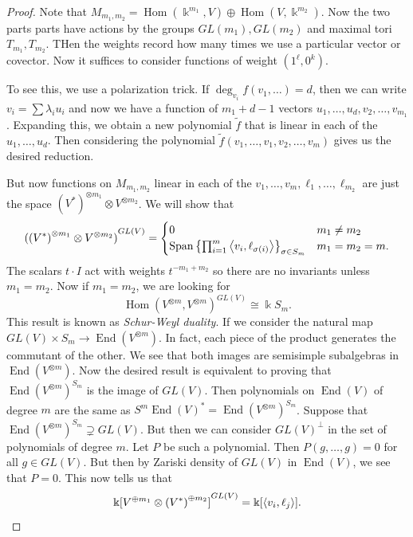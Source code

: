 \documentclass[leqno, openany]{memoir}
\theoremstyle{definition}
\theoremstyle{remark}
\theoremstyle{plain}
\theoremstyle{definition}
\theoremstyle{remark}
\renewcommand{\k}{\Bbbk}
\newcommand{\wtl}[1]{\widetilde{#1}}
\DeclareMathOperator{\Hom}{Hom}
\DeclareMathOperator{\End}{End}
\begin{document}
\begin{proof} Note that $M_{m_1, m_2} = \Hom(\k^{m_1}, V) \oplus \Hom(V,
    \k^{m_2})$. Now the two parts parts have actions by the groups $GL(m_1),
    GL(m_2)$ and maximal tori $T_{m_1}, T_{m_2}$. THen the weights record how
    many times we use a particular vector or covector. Now it suffices to
    consider functions of weight $(1^{\ell}, 0^k)$.

    To see this, we use a polarization trick. If $\deg_{v_i} f(v_1, \ldots) =
    d$, then we can write $v_i = \sum \lambda_i u_i$ and now we have a function
    of $m_1 + d-1$ vectors $u_1, \ldots, u_d, v_2, \ldots, v_{m_1}$. Expanding
    this, we obtain a new polynomial $\wtl{f}$ that is linear in each of the
    $u_1, \ldots, u_d$. Then considering the polynomial $\wtl{f}(v_1, \ldots,
    v_1, v_2, \ldots, v_m)$ gives us the desired reduction.

    But now functions on $M_{m_1, m_2}$ linear in each of the $v_1, \ldots,
    v_m, \ell_1, \ldots, \ell_{m_2}$ are just the space ${(V^*)}^{\otimes m_1}
    \otimes V^{\otimes m_2}$. We will show that \[ {({(V^*)}^{\otimes m_1}
        \otimes V^{\otimes m_2})}^{GL(V)} = \begin{cases} 0 & m_1 \neq m_2 \\
        \operatorname{Span} \qty{\prod_{i=1}^m \ev{v_i,
    \ell_{\sigma(i)}}}_{\sigma \in S_m} & m_1 = m_2 = m.  \end{cases} \] The
    scalars $t\cdot I$ act with weights $t^{-m_1 + m_2}$ so there are no
    invariants unless $m_1 = m_2$. Now if $m_1 = m_2$, we are looking for \[
    {\Hom(V^{\otimes m}, V^{\otimes m})}^{GL(V)} \cong \k S_m. \] This result
    is known as \textit{Schur-Weyl duality}. If we consider the natural map
    $GL(V) \times S_m \to \End(V^{\otimes m})$. In fact, each piece of the
    product generates the commutant of the other. We see that both images are
    semisimple subalgebras in $\End(V^{\otimes m})$. Now the desired result is
    equivalent to proving that ${\End(V^{\otimes m})}^{S_m}$ is the image of
    $GL(V)$. Then polynomials on $\End(V)$ of degree $m$ are the same as $S^m
    {\End(V)}^* = {\End(V^{\otimes m})}^{S_m}$. Suppose that ${\End(V^{\otimes
    m})}^{S_m} \supsetneq GL(V)$. But then we can consider ${GL(V)}^{\perp}$ in
    the set of polynomials of degree $m$. Let $P$ be such a polynomial. Then
    $P(g, \ldots, g) = 0$ for all $g \in GL(V)$. But then by Zariski density of
    $GL(V)$ in $\End(V)$, we see that $P = 0$. This now tells us that \[ {
    \k[V^{\oplus m_1} \otimes {(V^*)}^{\oplus m_2}] }^{GL(V)} = \k[\ev{v_i,
    \ell_j}]. \]


\end{proof}
\end{document}
